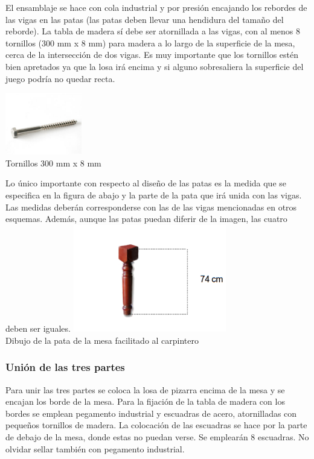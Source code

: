El ensamblaje se hace con cola industrial y por presión encajando los rebordes de las vigas en las patas (las patas deben llevar una hendidura del tamaño del reborde).
La tabla de madera sí debe ser atornillada a las vigas, con al menos 8 tornillos  (300 mm x 8 mm) para madera a lo largo de la superficie de la mesa,  cerca de la intersección de dos vigas. 
Es muy importante que los tornillos estén bien apretados ya que la losa irá encima y si alguno sobresaliera la superficie del juego podría no quedar recta. 

\begin{center}
    		\includegraphics[width=0.25\textwidth]{_42-100.jpg}
		 \\ \small {Tornillos  300 mm x 8 mm}
	\end{center}

\begin{center}

Lo único importante con respecto al diseño de las patas es la medida que se especifica en la figura de abajo y la parte de la pata que irá unida con las vigas. Las medidas deberán corresponderse con las de las vigas mencionadas en otros esquemas.
Además, aunque las patas puedan diferir de la imagen, las cuatro deben ser iguales.   
 		\includegraphics[width=0.5\textwidth]{Pata.png}
		 \\ \small {Dibujo de la pata de la mesa facilitado al carpintero}
	\end{center}


\subsubsection {Unión de las tres partes}

Para unir las tres partes se coloca la losa de pizarra encima de la mesa y se encajan los borde de la mesa. Para la fijación de la tabla de madera con los bordes se emplean pegamento industrial y escuadras de acero, atornilladas con pequeños tornillos de madera.
La colocación de las escuadras  se hace por la parte de debajo de la mesa, donde estas no puedan verse. Se emplearán 8 escuadras. No olvidar sellar también con pegamento industrial. 


